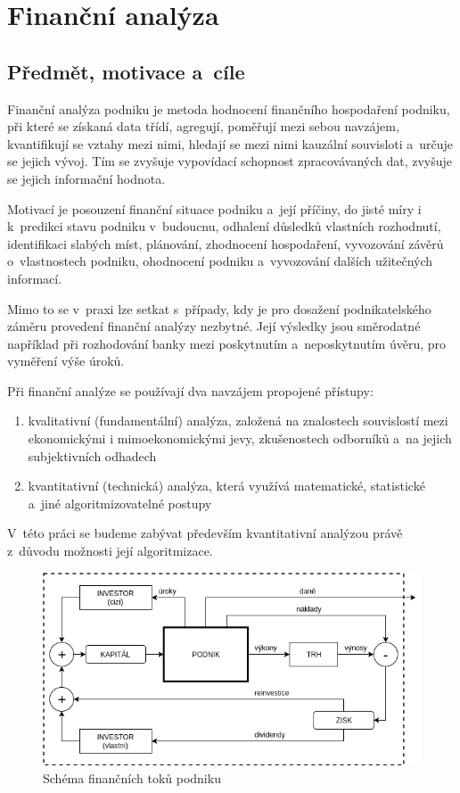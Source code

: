 \chapter{Finanční analýza}


\section{Předmět, motivace a~cíle}
Finanční analýza podniku je metoda hodnocení finančního hospodaření podniku, při které se získaná data třídí, agregují, poměřují mezi sebou navzájem, kvantifikují se vztahy mezi nimi, hledají se mezi nimi kauzální souvisloti a~určuje se jejich vývoj. Tím se zvyšuje vypovídací schopnost zpracovávaných dat, zvyšuje se jejich informační hodnota\cite{sedl}.

Motivací je posouzení finanční situace podniku a~její příčiny, do jisté míry i k~predikci stavu podniku v~budoucnu, odhalení důsledků vlastních rozhodnutí, identifikaci slabých míst, plánování, zhodnocení hospodaření, vyvozování závěrů o~vlastnostech podniku, ohodnocení podniku a~vyvozování dalších užitečných informací.

Mimo to se v~praxi lze setkat s~případy, kdy je pro dosažení podnikatelského záměru provedení finanční analýzy nezbytné. Její výsledky jsou směrodatné například při rozhodování banky mezi poskytnutím a~neposkytnutím úvěru, pro vyměření výše úroků.

Při finanční analýze se používají dva navzájem propojené přístupy\cite{kova}:
\begin{enumerate}
	\item kvalitativní (fundamentální) analýza, založená na znalostech souvislostí mezi ekonomickými i mimoekonomickými jevy, zkušenostech odborníků a~na jejich subjektivních odhadech
	\item kvantitativní (technická) analýza, která využívá matematické, statistické a~jiné algoritmizovatelné postupy
\end{enumerate}

V~této práci se budeme zabývat především kvantitativní analýzou právě z~důvodu možnosti její algoritmizace.


\begin{figure}
  \centering
  \includegraphics[width=14cm]{img/ccf.png}
  \caption{Schéma finančních toků podniku \cite{sedl}}
  \label{ccf}
\end{figure}


